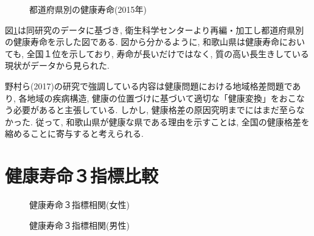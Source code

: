 

\begin{figure}[h!]
	\begin{center}
		\caption{都道府県別の健康寿命(2015年)}\label{fig11}
	\end{center}
\end{figure}

図\ref{fig11}は同研究のデータに基づき, 衛生科学センターより再編・加工し都道府県別の健康寿命を示した図である. 図から分かるように, 和歌山県は健康寿命においても, 全国１位を示しており, 寿命が長いだけではなく, 質の高い長生きしている現状がデータから見られた.

野村ら(2017)の研究で強調している内容は健康問題における地域格差問題であり, 各地域の疾病構造, 健康の位置づけに基づいて適切な「健康変換」をおこなう必要があると主張している. しかし, 健康格差の原因究明までにはまだ至らなかった. 従って, 和歌山県が健康な県である理由を示すことは, 全国の健康格差を縮めることに寄与すると考えられる.

%

\section{健康寿命３指標比較}
\begin{figure}[h!]
	\begin{center}
		\caption{健康寿命３指標相関(女性)}
	\end{center}
\end{figure}

\begin{figure}[h!]
	\begin{center}
		\caption{健康寿命３指標相関(男性)}
	\end{center}
\end{figure}



